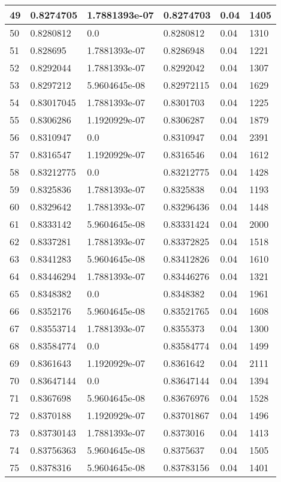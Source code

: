 \begin{longtable}{|l|l|l|l|l|l|}
49 & 0.8274705 & 1.7881393e-07 & 0.8274703 & 0.04 & 1405 \\ \hline 
50 & 0.8280812 & 0.0 & 0.8280812 & 0.04 & 1310 \\ \hline 
51 & 0.828695 & 1.7881393e-07 & 0.8286948 & 0.04 & 1221 \\ \hline 
52 & 0.8292044 & 1.7881393e-07 & 0.8292042 & 0.04 & 1307 \\ \hline 
53 & 0.8297212 & 5.9604645e-08 & 0.82972115 & 0.04 & 1629 \\ \hline 
54 & 0.83017045 & 1.7881393e-07 & 0.8301703 & 0.04 & 1225 \\ \hline 
55 & 0.8306286 & 1.1920929e-07 & 0.8306287 & 0.04 & 1879 \\ \hline 
56 & 0.8310947 & 0.0 & 0.8310947 & 0.04 & 2391 \\ \hline 
57 & 0.8316547 & 1.1920929e-07 & 0.8316546 & 0.04 & 1612 \\ \hline 
58 & 0.83212775 & 0.0 & 0.83212775 & 0.04 & 1428 \\ \hline 
59 & 0.8325836 & 1.7881393e-07 & 0.8325838 & 0.04 & 1193 \\ \hline 
60 & 0.8329642 & 1.7881393e-07 & 0.83296436 & 0.04 & 1448 \\ \hline 
61 & 0.8333142 & 5.9604645e-08 & 0.83331424 & 0.04 & 2000 \\ \hline 
62 & 0.8337281 & 1.7881393e-07 & 0.83372825 & 0.04 & 1518 \\ \hline 
63 & 0.8341283 & 5.9604645e-08 & 0.83412826 & 0.04 & 1610 \\ \hline 
64 & 0.83446294 & 1.7881393e-07 & 0.83446276 & 0.04 & 1321 \\ \hline 
65 & 0.8348382 & 0.0 & 0.8348382 & 0.04 & 1961 \\ \hline 
66 & 0.8352176 & 5.9604645e-08 & 0.83521765 & 0.04 & 1608 \\ \hline 
67 & 0.83553714 & 1.7881393e-07 & 0.8355373 & 0.04 & 1300 \\ \hline 
68 & 0.83584774 & 0.0 & 0.83584774 & 0.04 & 1499 \\ \hline 
69 & 0.8361643 & 1.1920929e-07 & 0.8361642 & 0.04 & 2111 \\ \hline 
70 & 0.83647144 & 0.0 & 0.83647144 & 0.04 & 1394 \\ \hline 
71 & 0.8367698 & 5.9604645e-08 & 0.83676976 & 0.04 & 1528 \\ \hline 
72 & 0.8370188 & 1.1920929e-07 & 0.83701867 & 0.04 & 1496 \\ \hline 
73 & 0.83730143 & 1.7881393e-07 & 0.8373016 & 0.04 & 1413 \\ \hline 
74 & 0.83756363 & 5.9604645e-08 & 0.8375637 & 0.04 & 1505 \\ \hline 
75 & 0.8378316 & 5.9604645e-08 & 0.83783156 & 0.04 & 1401 \\ \hline 
\end{longtable}